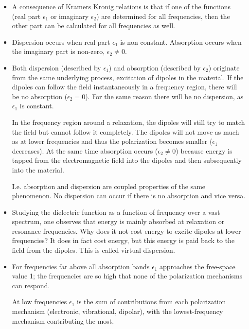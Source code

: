 \begin{itemize}
    \item A consequence of Kramers Kronig relations is that if one of the functions (real part $\epsilon_1$ or imaginary $\epsilon_2$) are determined for all frequencies, then the other part can be calculated for all frequencies as well.
    
    \item Dispersion occurs when real part $\epsilon_1$ is non-constant. Absorption occurs when the imaginary part is non-zero, $\epsilon_2 \neq 0$.
    
    \item Both dispersion (described by $\epsilon_1$) and absorption (described by $\epsilon_2$) originate from the same underlying process, excitation of dipoles in the material. If the dipoles can follow the field instantaneously in a frequency region, there will be no absorption ($\epsilon_2 = 0$). For the same reason there will be no dispersion, as $\epsilon_1$ is constant.
    
    In the frequency region around a relaxation, the dipoles will still try to match the field but cannot follow it completely. The dipoles will not move as much as at lower frequencies and thus the polarization becomes smaller ($\epsilon_1$ decreases). At the same time absorption occurs ($\epsilon_2 \neq 0$) because energy is tapped from the electromagnetic field into the dipoles and then subsequently into the material.
    
    I.e. absorption and dispersion are coupled properties of the same phenomenon. No dispersion can occur if there is no absorption and vice versa.
    
    \item Studying the dielectric function as a function of frequency over a vast spectrum, one observes that energy is mainly absorbed at relaxation or resonance frequencies. Why does it not cost energy to excite dipoles at lower frequencies? It does in fact cost energy, but this energy is paid back to the field from the dipoles. This is called virtual dispersion.
    
    \item For frequencies far above all absorption bands $\epsilon_1$ approaches the free-space value 1; the frequencies are so high that none of the polarization mechanisms can respond.
    
    At low frequencies $\epsilon_1$ is the sum of contributions from each polarization mechanism (electronic, vibrational, dipolar), with the lowest-frequency mechanism contributing the most.
    

\end{itemize}
